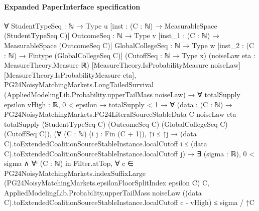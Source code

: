 \documentclass[10pt]{article}
\begin{document}
\paragraph{Expanded PaperInterface specification}
\begin{ReviewVerbatim}
∀ {StudentTypeSeq : ℕ → Type u} [inst : (C : ℕ) → MeasurableSpace (StudentTypeSeq C)] {OutcomeSeq : ℕ → Type v}
  [inst_1 : (C : ℕ) → MeasurableSpace (OutcomeSeq C)] {GlobalCollegeSeq : ℕ → Type w}
  [inst_2 : (C : ℕ) → Fintype (GlobalCollegeSeq C)] (CutoffSeq : ℕ → Type x) (noiseLaw eta : MeasureTheory.Measure ℝ)
  [MeasureTheory.IsProbabilityMeasure noiseLaw] [MeasureTheory.IsProbabilityMeasure eta],
  PG24NoisyMatchingMarkets.LongTailedSurvival (AppliedModelingLib.Probability.upperTailMass noiseLaw) →
    ∀ {totalSupply epsilon vHigh : ℝ},
      0 < epsilon →
        totalSupply < 1 →
          ∀
            (data :
              (C : ℕ) →
                PG24NoisyMatchingMarkets.PG24LiteralSourceStableData C noiseLaw eta totalSupply (StudentTypeSeq C)
                  (OutcomeSeq C) (GlobalCollegeSeq C) (CutoffSeq C)),
            (∀ (C : ℕ) (i j : Fin (C + 1)),
                ↑i ≤ ↑j →
                  (data C).toExtendedCoalitionSourceStableInstance.localCutoff i ≤
                    (data C).toExtendedCoalitionSourceStableInstance.localCutoff j) →
              ∃ (sigma : ℝ),
                0 < sigma ∧
                  ∀ᶠ (C : ℕ) in Filter.atTop,
                    ∀
                      c ∈
                        PG24NoisyMatchingMarkets.indexSuffixLarge
                          (PG24NoisyMatchingMarkets.epsilonFloorSplitIndex epsilon C) C,
                      AppliedModelingLib.Probability.upperTailMass noiseLaw
                          ((data C).toExtendedCoalitionSourceStableInstance.localCutoff c - vHigh) ≤
                        sigma / ↑C
\end{ReviewVerbatim}
\end{document}
